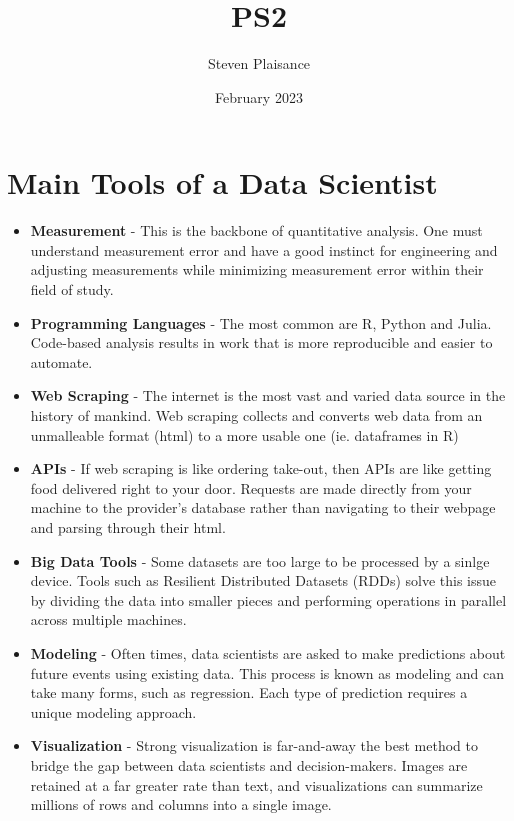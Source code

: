 \documentclass{article}
\title{PS2}
\author{Steven Plaisance}
\date{February 2023}
\begin{document}
\maketitle

\section*{Main Tools of a Data Scientist}

\begin{itemize}
  \item \textbf{Measurement} - This is the backbone of quantitative analysis. One must understand measurement error and have a good instinct for engineering and adjusting measurements while minimizing measurement error within their field of study. 
  \item \textbf{Programming Languages} - The most common are R, Python and Julia. Code-based analysis results in work that is more reproducible and easier to automate.  
  \item \textbf{Web Scraping} - The internet is the most vast and varied data source in the history of mankind. Web scraping collects and converts web data from an unmalleable format (html) to a more usable one (ie. dataframes in R)
  \item \textbf{APIs} - If web scraping is like ordering take-out, then APIs are like getting food delivered right to your door. Requests are made directly from your machine to the provider's database rather than navigating to their webpage and parsing through their html. 
  \item \textbf{Big Data Tools} - Some datasets are too large to be processed by a sinlge device. Tools such as Resilient Distributed Datasets (RDDs) solve this issue by dividing the data into smaller pieces and performing operations in parallel across multiple machines. 
  \item \textbf{Modeling} - Often times, data scientists are asked to make predictions about future events using existing data. This process is known as modeling and can take many forms, such as regression. Each type of prediction requires a unique modeling approach. 
  \item \textbf{Visualization} - Strong visualization is far-and-away the best method to bridge the gap between data scientists and decision-makers. Images are retained at a far greater rate than text, and visualizations can summarize millions of rows and columns into a single image.
\end{itemize}
\end{document}
